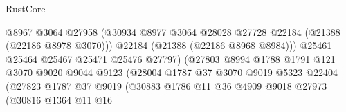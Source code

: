 \begin{lexlean}{RustCore}
\begin{coremodule}
                                              @8967
                                              @3064
                                              @27958
                                              (@30934
                                                @8977
                                                @3064
                                                @28028
                                                @27728
                                                @22184
                                                (@21388 (@22186 @8978 @3070)))
                                              @22184
                                              (@21388 (@22186 @8968 @8984)))
                                            @25461
                                            @25464
                                            @25467
                                            @25471
                                            @25476
                                            @27797)
                                          (@27803
                                            @8994
                                            @1788
                                            @1791
                                            @121
                                            @3070
                                            @9020
                                            @9044
                                            @9123
                                            (@28004
                                              @1787
                                              @37
                                              @3070
                                              @9019
                                              @5323
                                              @22404
                                              (@27823
                                                @1787
                                                @37
                                                @9019
                                                (@30883
                                                  @1786
                                                  @11
                                                  @36
                                                  @4909
                                                  @9018
                                                  @27973
                                                  (@30816
                                                    @1364
                                                    @11
                                                    @16

\end{coremodule}
\end{lexlean}
